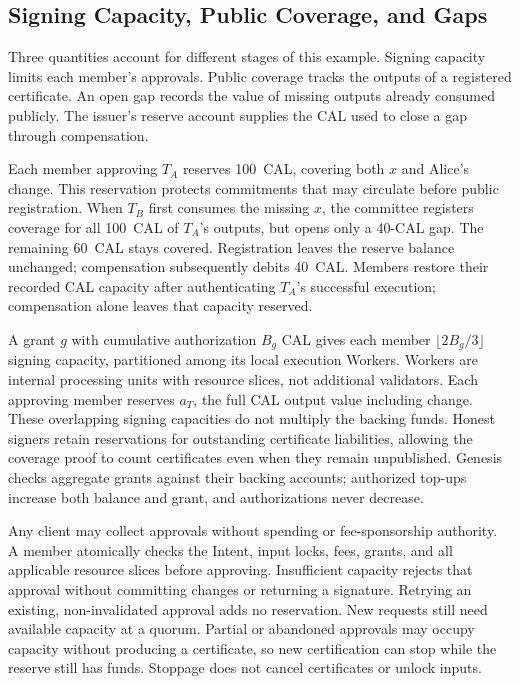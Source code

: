 \subsection{Signing Capacity, Public Coverage, and Gaps}
\label{sec:model-layers}

Three quantities account for different stages of this example. Signing capacity limits each member's approvals. Public coverage tracks the outputs of a registered certificate. An open gap records the value of missing outputs already consumed publicly. The issuer's reserve account supplies the CAL used to close a gap through compensation.

Each member approving $T_A$ reserves 100~CAL, covering both $x$ and Alice's change. This reservation protects commitments that may circulate before public registration. When $T_B$ first consumes the missing $x$, the committee registers coverage for all 100~CAL of $T_A$'s outputs, but opens only a 40-CAL gap. The remaining 60~CAL stays covered. Registration leaves the reserve balance unchanged; compensation subsequently debits 40~CAL. Members restore their recorded CAL capacity after authenticating $T_A$'s successful execution; compensation alone leaves that capacity reserved.

A grant $g$ with cumulative authorization $B_g$ CAL gives each member $\lfloor2B_g/3\rfloor$ signing capacity, partitioned among its local execution Workers. Workers are internal processing units with resource slices, not additional validators. Each approving member reserves $a_T$, the full CAL output value including change. These overlapping signing capacities do not multiply the backing funds. Honest signers retain reservations for outstanding certificate liabilities, allowing the coverage proof to count certificates even when they remain unpublished. Genesis checks aggregate grants against their backing accounts; authorized top-ups increase both balance and grant, and authorizations never decrease.

Any client may collect approvals without spending or fee-sponsorship authority. A member atomically checks the Intent, input locks, fees, grants, and all applicable resource slices before approving. Insufficient capacity rejects that approval without committing changes or returning a signature. Retrying an existing, non-invalidated approval adds no reservation. New requests still need available capacity at a quorum. Partial or abandoned approvals may occupy capacity without producing a certificate, so new certification can stop while the reserve still has funds. Stoppage does not cancel certificates or unlock inputs.

